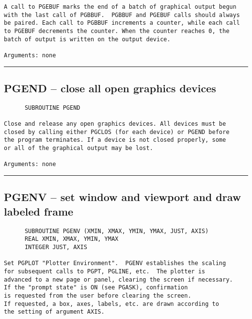 {\begin{verbatim}
A call to PGEBUF marks the end of a batch of graphical output begun
with the last call of PGBBUF.  PGBBUF and PGEBUF calls should always
be paired. Each call to PGBBUF increments a counter, while each call
to PGEBUF decrements the counter. When the counter reaches 0, the
batch of output is written on the output device.

Arguments: none
\end{verbatim}
\hrule


\subsection*{PGEND -- close all open graphics devices }
\begin{verbatim}
      SUBROUTINE PGEND

Close and release any open graphics devices. All devices must be
closed by calling either PGCLOS (for each device) or PGEND before
the program terminates. If a device is not closed properly, some
or all of the graphical output may be lost.

Arguments: none
\end{verbatim}
\hrule


\subsection*{PGENV -- set window and viewport and draw labeled frame }
\begin{verbatim}
      SUBROUTINE PGENV (XMIN, XMAX, YMIN, YMAX, JUST, AXIS)
      REAL XMIN, XMAX, YMIN, YMAX
      INTEGER JUST, AXIS

Set PGPLOT "Plotter Environment".  PGENV establishes the scaling
for subsequent calls to PGPT, PGLINE, etc.  The plotter is
advanced to a new page or panel, clearing the screen if necessary.
If the "prompt state" is ON (see PGASK), confirmation
is requested from the user before clearing the screen.
If requested, a box, axes, labels, etc. are drawn according to
the setting of argument AXIS.


\end{verbatim}}
